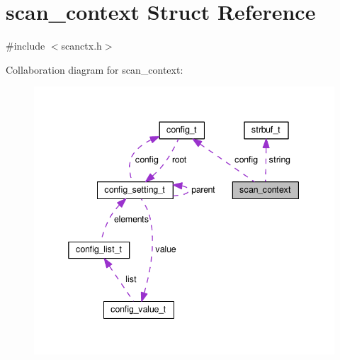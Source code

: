 \hypertarget{structscan__context}{\section{scan\-\_\-context Struct Reference}
\label{structscan__context}
}


{\ttfamily \#include $<$scanctx.\-h$>$}



Collaboration diagram for scan\-\_\-context\-:\nopagebreak
\begin{figure}[H]
\begin{center}
\leavevmode
\includegraphics[width=341pt]{structscan__context__coll__graph}
\end{center}
\end{figure}
